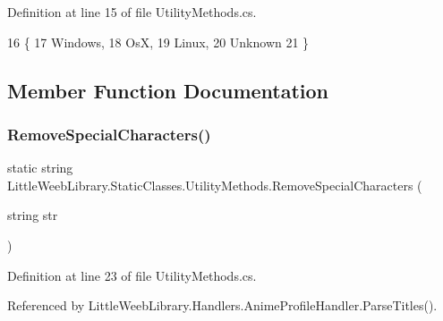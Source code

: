 Definition at line 15 of file Utility\+Methods.\+cs.


\begin{DoxyCode}
16         \{
17             Windows,
18             OsX,
19             Linux,
20             Unknown
21         \}
\end{DoxyCode}


\subsection{Member Function Documentation}
\mbox{\label{class_little_weeb_library_1_1_static_classes_1_1_utility_methods_aa04235b1cf84b6741c496d8ecaea0eeb}} 
\subsubsection{\texorpdfstring{Remove\+Special\+Characters()}{RemoveSpecialCharacters()}}
{\footnotesize\ttfamily static string Little\+Weeb\+Library.\+Static\+Classes.\+Utility\+Methods.\+Remove\+Special\+Characters (\begin{DoxyParamCaption}\item[{string}]{str }\end{DoxyParamCaption})\hspace{0.3cm}{\ttfamily [static]}}



Definition at line 23 of file Utility\+Methods.\+cs.



Referenced by Little\+Weeb\+Library.\+Handlers.\+Anime\+Profile\+Handler.\+Parse\+Titles().


